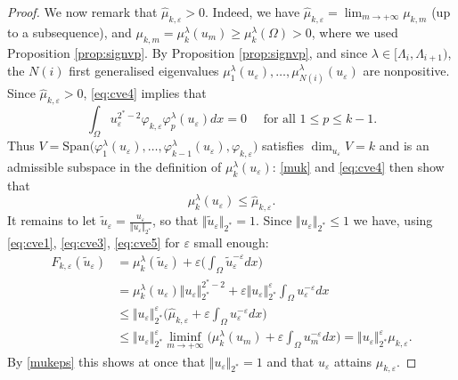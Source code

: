 \documentclass[10pt,a4paper]{amsart}
\newcommand{\Fke}{F_{k,\ve}}
\newcommand{\Om}{\Omega}
\newcommand{\mkle}{\mu_{k,\ve}}
\newcommand{\mkl}{\mu_{k}^{\lambda}}
\newcommand{\ve}{\varepsilon}
\newcommand{\vp}{\varphi}
\begin{document}
\begin{proof}
We now remark that $\hat{\mu}_{k,\ve} >0$. Indeed, we have $\hat{\mu}_{k,\ve} =  \lim_{m \to + \infty} \mu_{k,m}$ (up to a subsequence), and $\mu_{k,m} = \mkl(u_m) \ge \mkl(\Om) >0$, where we used Proposition \ref{prop:signvp}. By Proposition \ref{prop:signvp}, and since $\lambda \in [\Lambda_i, \Lambda_{i+1})$, the $N(i)$ first generalised eigenvalues $\mu_1^{\lambda}(u_\ve), \dots, \mu_{N(i)}^{\lambda}(u_\ve)$ are nonpositive. Since $\hat{\mu}_{k,\ve} >0$, \eqref{eq:cve4} implies that 
$$ \int_{\Om} u_\ve^{2^*-2} \vp_{k,\ve} \vp_p^{\lambda}(u_\ve)dx = 0 \quad \text{ for all } 1 \le p \le k-1. $$
Thus $V =  \text{Span} \big( \vp_1^{\lambda}(u_\ve), \dots, \vp_{k-1}^\lambda(u_\ve), \vp_{k,\ve}\big) $ satisfies $\dim_{u_\ve} V = k$ and is an admissible subspace in the definition of $\mkl(u_\ve)$: \eqref{muk} and \eqref{eq:cve4} then show that 
\begin{equation} \label{eq:cve5}
\mkl(u_\ve) \le \hat{\mu}_{k,\ve}.
\end{equation}
 It remains to let $ \tilde{u}_\ve = \frac{u_\ve}{\Vert u_\ve \Vert_{2^*}}$, so that $\Vert \tilde{u}_\ve \Vert_{2^*} = 1$. Since $\Vert u_\ve \Vert_{2^*} \le 1$ we have, using \eqref{eq:cve1},  \eqref{eq:cve3}, \eqref{eq:cve5} for $\ve$ small enough:
$$ \begin{aligned}
\Fke(\tilde{u}_\ve) & =  \mkl(\tilde{u}_\ve) + \ve  \Big(\int_{\Om} \tilde{u}_\ve^{-\ve}dx \Big)\\
& = \mkl(u_\ve) \Vert u_\ve \Vert_{2^*}^{2^*-2} + \ve \Vert u_\ve \Vert_{2^*}^{\ve} \int_{\Om}u_\ve^{-\ve}dx \\
& \le \Vert u_\ve \Vert_{2^*}^{\ve}\Big( \hat{\mu}_{k,\ve} + \ve \int_{\Om} u_\ve^{-\ve}dx \Big) \\
& \le \Vert u_\ve \Vert_{2^*}^{\ve}\liminf_{m \to + \infty} \Big(  \mkl(u_m) + \ve \int_{\Om} u_m^{-\ve}dx \Big)  = \Vert u_\ve \Vert_{2^*}^{\ve} \mkle.
\end{aligned} $$
By \eqref{mukeps} this shows at once that $\Vert u_\ve \Vert_{2^*} = 1$ and that $u_\ve$ attains $\mkle$. 
\end{proof}
\end{document}
